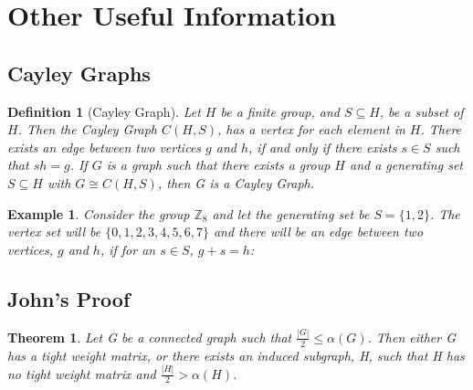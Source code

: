 \documentclass[12pt]{article}
\theoremstyle{parenbold}
\newtheorem{definition}{Definition}[section]
\newtheorem{exmp}{Example}[section]
\newtheorem{theorem}{Theorem}[section]
\begin{document}
\section{Other Useful Information}

\subsection{Cayley Graphs}
\begin{definition}[Cayley Graph]
Let $H$ be a finite group, and $S \subseteq H$, be a subset of $H$. Then the Cayley Graph $C(H,S)$, has a vertex for each element in $H$. There exists an edge between two vertices $g$ and $h$, if and only if there exists $s \in S$ such that $ sh = g$. If $G$ is a graph such that there exists a group $H$ and a generating set $S \subseteq H$ with $G \cong C(H,S)$, then G is a Cayley Graph. \cite{franccayley}

\end{definition}

\begin{exmp}
Consider the group $\mathbb{Z}_8$ and let the generating set be $S = \{1,2\}$. The vertex set will be $\{0,1,2,3,4,5,6,7\}$ and there will be an edge between two vertices, $g$ and $h$, if for an $s \in S$, $g + s = h$:
\\


\end{exmp}

\subsection{John's Proof}

\begin{theorem}
Let G be a connected graph such that $\frac{|G|}{2} \leq \alpha(G)$. Then either G has a tight weight matrix, or there exists an induced subgraph, H, such that H has no tight weight matrix and $\frac{|H|}{2} > \alpha(H)$.
\end{theorem}
\end{document}

